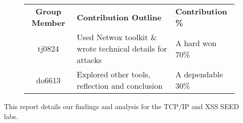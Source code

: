 \begin{figure}[h]
\centering
\begin{tabular}{|c|p{9.5cm}|l|}
\hline
{\bf Group Member} & {\bf Contribution Outline} & {\bf Contribution \%} \\
\hhline{|=|=|=|}
tj0824 & Used Netwox toolkit \& wrote technical details for attacks & A hard won 70\% \\
\hline
do6613 & Explored other tools, reflection and conclusion & A dependable 30\% \\
\hline
\end{tabular}
\end{figure}

This report details our findings and analysis for the TCP/IP and XSS SEED labs.
